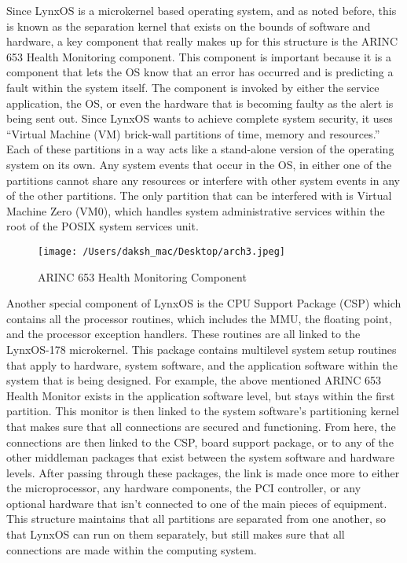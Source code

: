 \documentclass[12pt]{article}
\begin{document}
Since LynxOS is a microkernel based operating system, and as noted before, this is
known as the separation kernel that exists on the bounds of software and hardware, a key
component that really makes up for this structure is the ARINC 653 Health Monitoring
component. This component is important because it is a component that lets the OS know that an
error has occurred and is predicting a fault within the system itself. The component is invoked by
either the service application, the OS, or even the hardware that is becoming faulty as the alert is
being sent out. Since LynxOS wants to achieve complete system security, it uses “Virtual
Machine (VM) brick-wall partitions of time, memory and resources.” Each of these partitions
in a way acts like a stand-alone version of the operating system on its own. Any system events
that occur in the OS, in either one of the partitions cannot share any resources or interfere with
other system events in any of the other partitions. The only partition that can be interfered with is
Virtual Machine Zero (VM0), which handles system administrative services within the root of
the POSIX system services unit.

\begin{figure}[H]
	\centering
	\texttt{[image: /Users/daksh\_mac/Desktop/arch3.jpeg]}
	\caption[About arch]{ARINC 653 Health Monitoring Component}
	\label{fig:arch1}	
\end{figure}

Another special component of LynxOS is the CPU Support Package (CSP) which
contains all the processor routines, which includes the MMU, the floating point, and the
processor exception handlers. These routines are all linked to the LynxOS-178 microkernel. This
package contains multilevel system setup routines that apply to hardware, system software, and
the application software within the system that is being designed. For example, the above
mentioned ARINC 653 Health Monitor exists in the application software level, but stays within
the first partition. This monitor is then linked to the system software’s partitioning kernel that
makes sure that all connections are secured and functioning. From here, the connections are then linked to the CSP, board support package, or to any of the other middleman packages that exist
between the system software and hardware levels. After passing through these packages, the link
is made once more to either the microprocessor, any hardware components, the PCI controller, or
any optional hardware that isn’t connected to one of the main pieces of equipment. This structure
maintains that all partitions are separated from one another, so that LynxOS can run on them
separately, but still makes sure that all connections are made within the computing system.
\end{document}

